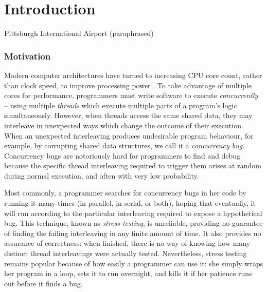 \chapter{Introduction}
{Pittsburgh International Airport (paraphrased)}

\subsection{Motivation}

Modern computer architectures have turned to increasing CPU core count, rather than clock speed, to improve processing power \cite{mooreslaw}.
To take advantage of multiple cores for performance, programmers must write software to execute {\em concurrently} --
using multiple {\em threads} which execute multiple parts of a program's logic simultaneously.
However, when threads access the same shared data, they may interleave in unexpected ways which change the outcome of their execution.
When an unexpected interleaving produces undesirable program behaviour,
for example, by corrupting shared data structures,
we call it a {\em concurrency bug}.
Concurrency bugs are notoriously hard for programmers to find and debug
because the specific thread interleaving required to trigger them arises at random during normal execution,
and often with very low probability.

Most commonly, a programmer searches for concurrency bugs in her code by running it many times (in parallel, in serial, or both),
hoping that eventually, it will run according to the particular interleaving required to expose a hypothetical bug.
This technique, known as {\em stress testing}, is unreliable,
providing no guarantee of finding the failing interleaving in any finite amount of time.
It also provides no assurance of correctness:
when finished, there is no way of knowing how many distinct thread interleavings were actually tested.
Nevertheless, stress testing remains popular because of how easily a programmer can use it:
she simply wraps her program in a loop, sets it to run overnight, and kills it if her patience runs out before it finds a bug.

